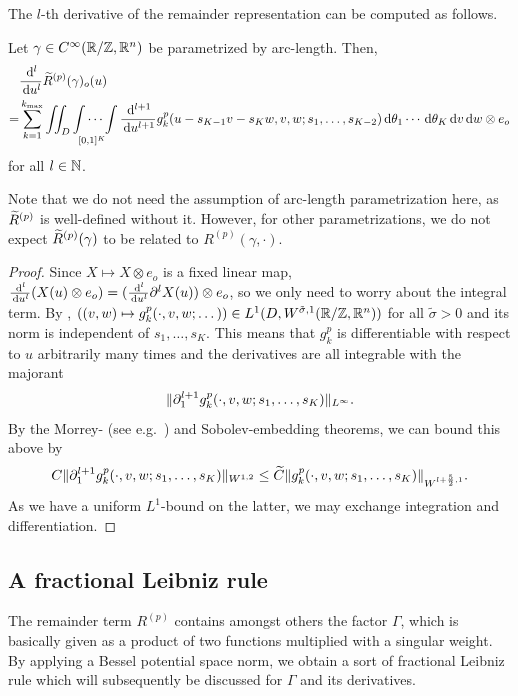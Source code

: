 The $l$-th derivative of the remainder representation \Rpt{} can be computed as follows.
\begin{lemma}
    Let $\gamma \in C^\infty(\mathbb{R}/\mathbb{Z},\mathbb{R}^n)$ be parametrized by arc-length.
    Then, 
    \[
        \begin{split}
            &\frac {\,\mathrm{d}^l} {\,\mathrm{d} u^l} \widetilde R^{(p)}(\gamma)_o(u)\\
            =& \sum_{k=1}^{k_{\max}} \iint_{D} \idotsint\limits_{[0,1]^K} \frac {\,\mathrm{d}^{l+1}} {\,\mathrm{d} u^{l+1}} g^p_k(u - s_{K-1}v - s_K w,v,w;s_{1},\dots,s_{K-2}) \,\mathrm{d}\theta_{1}\cdots\,\mathrm{d}\theta_{K}\,\mathrm{d} v \,\mathrm{d} w\otimes e_o
        \end{split}
    \]
    for all $l \in \mathbb{N}$.
\end{lemma}
Note that we do not need the assumption of arc-length parametrization here, as $\widetilde R^{(p)}$ is well-defined without it.
However, for other parametrizations, we do not expect $\widetilde R^{(p)}(\gamma)$ to be related to $R^{(p)}(\gamma,\cdot)$.
\begin{proof}
    Since $X \mapsto X \otimes e_o$ is a fixed linear map, $\frac {\,\mathrm{d}^l} {\,\mathrm{d} u^l} (X(u) \otimes e_o) = ( \frac {\,\mathrm{d}^l} {\,\mathrm{d} u^l} \partial^l X(u)) \otimes e_o$, so we only need to worry about the integral term.
    By , $((v,w) \mapsto g^{p}_k(\cdot,v,w;\dots))\in L^{1}(D,W^{\tilde \sigma,1}(\mathbb{R}/\mathbb{Z}, \mathbb{R}^{n}))$ for all $\tilde\sigma>0$ and its norm is independent of $s_1, \ldots, s_K$.
    This means that $g^p_k$ is differentiable with respect to $u$ arbitrarily many times and the derivatives are all integrable with the majorant
    \[
        \norm[L^\infty]{\partial_1^{l+1} g^p_k(\cdot,v,w;s_1,\ldots,s_K)}.
    \]
    By the Morrey- (see e.g.\ \cite[Paragraph~4.16]{AdamsFournier:2003:SobolevSpaces}) and Sobolev-embedding theorems, we can bound this above by
    \[
        C\norm[W^{1,2}]{\partial_1^{l+1} g^p_k(\cdot,v,w;s_1,\ldots,s_K)}
        \le \widetilde C \norm[W^{l + \frac 5 2,1}]{g^p_k(\cdot,v,w;s_1,\ldots,s_K)}.
    \]
    As we have a uniform $L^1$-bound on the latter, we may exchange integration and differentiation.
\end{proof}

\subsection{A fractional Leibniz rule} \label{subsec:FractionalLeibnizRule}

The remainder term $R^{(p)}$ contains amongst others the factor $\Gamma$, which is basically given as a product of two functions multiplied with a singular weight. By applying a Bessel potential space norm, we obtain a sort of fractional Leibniz rule which will subsequently be discussed for $\Gamma$ and its derivatives. 


